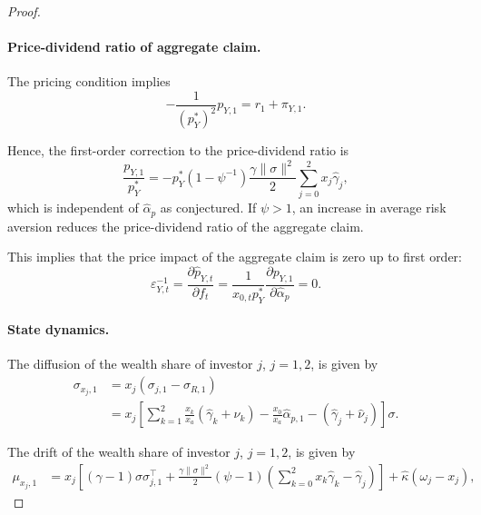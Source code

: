\begin{proof}
\paragraph{Price-dividend ratio of aggregate claim.}
The pricing condition implies
\begin{equation}
    -\frac{1}{(p_{Y}^*)^2} p_{Y,1} = r_1 + \pi_{Y,1}.
\end{equation}

Hence, the first-order correction to the price-dividend ratio is
\begin{equation}
    \frac{p_{Y,1}}{p_{Y}^*} = - p_{Y}^* (1-\psi^{-1}) \frac{\gamma  \|\sigma\|^2}{2}\sum_{j=0}^2 x_{j} \hat{\gamma}_j,
\end{equation}
which is independent of $\hat{\alpha}_p$ as conjectured.
If $\psi>1$, an increase in average risk aversion reduces the price-dividend ratio of the aggregate claim.

This implies that the price impact of the aggregate claim is zero up to first order:
\begin{equation}
    \varepsilon_{Y,t}^{-1} = \frac{\partial \hat{p}_{Y,t}}{\partial f_t} = \frac{1}{x_{0,t} p_{Y}^*} \frac{\partial p_{Y,1}}{\partial \hat{\alpha}_p} = 0.
\end{equation}

\paragraph{State dynamics.} The diffusion of the wealth share of investor $j$, $j=1,2$, is given by
\begin{align}
    \sigma_{x_j,1} &= x_j (\sigma_{j,1} - \sigma_{R,1})\nonumber\\
    &= x_j \left[ \sum_{k=1}^2 \frac{x_k}{x_a}(\hat{\gamma}_k+ \hat{\nu}_k) -\frac{x_0}{x_a}\hat{\alpha}_{p,1} - (\hat{\gamma}_j+ \hat{\nu}_j)\right] \sigma.
\end{align}

The drift of the wealth share of investor $j$, $j=1,2$, is given by
\begin{align}
    \mu_{x_j,1} &= x_{j} \left[ 
        (\gamma-1)\sigma  \sigma_{j,1}^\top +\frac{\gamma \|\sigma\|^2}{2} (\psi-1) \left( \sum_{k=0}^2 x_k\hat{\gamma}_k  - \hat{\gamma}_j\right)
     \right] + \hat{\kappa} (\omega_j - x_{j}),
\end{align}


\end{proof}
